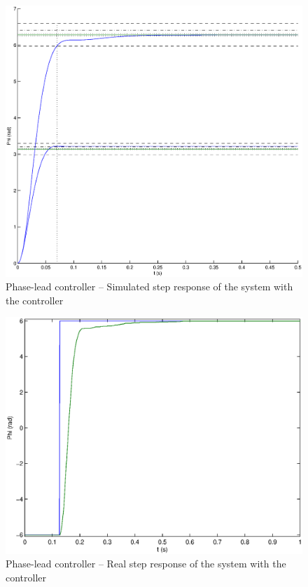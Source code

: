 \begin{center}
 \begin{figure}[ht]
 \includegraphics[width=\linewidth]{fig/step_simu_avance.eps}
 \caption{Phase-lead controller -- Simulated step response of the system with the controller}
 \label{step_simu_avance}
 \end{figure}
\end{center}


\begin{center}
 \begin{figure}[ht]
 \includegraphics[width=\linewidth]{fig/step_true_avance.eps}
 \caption{Phase-lead controller -- Real step response of the system with the controller}
 \label{step_true_advance}
 \end{figure}
\end{center}


